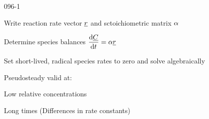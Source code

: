 \begin{mitframe}{096-1}
		\begin{listtwo}
		\item Write reaction rate vector $\uline\pos$ and sctoichiometric matrix $\tdiff$
   		 \item Determine species balances $\dfrac{\mathrm{d}\uline{\conc}}{\mathrm{d}\timet}=\tdiff\uline{\pos}$
   		 \item Set short-lived, radical species rates to zero and solve algebraically
    \end{listtwo}    
\begin{listone}
	\item Pseudosteady valid at:
    	\begin{listtwo}
        	\item Low relative concentrations
            \item Long times (Differences in rate constants)
        \end{listtwo}
\end{listone}
\end{mitframe}